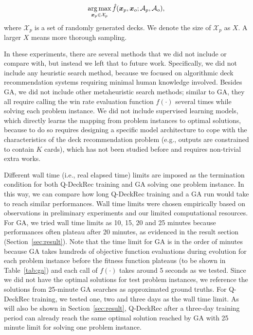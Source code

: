 \begin{align}
\operatorname*{arg\,max}_{\boldsymbol{x}_p \in \mathcal{X}_p} \hat{f}(\boldsymbol{x}_p, \boldsymbol{x}_o; \mathcal{A}_p, \mathcal{A}_o),
\label{eqn:mcmaxobj}
\end{align}
where $\mathcal{X}_p$ is a set of randomly generated decks. We denote the size of $\mathcal{X}_p$ as $X$. A larger $X$ means more thorough sampling.

In these experiments, there are several methods that we did not include or compare with, but instead we left that to future work. Specifically, we did not include any heuristic search method, because we focused on algorithmic deck recommendation systems requiring minimal human knowledge involved. Besides GA, we did not include other metaheuristic search methods; similar to GA, they all require calling the win rate evaluation function $f(\cdot)$ several times while solving each problem instance. We did not include supervised learning models, which directly learns the mapping from problem instances to optimal solutions, because to do so requires designing a specific model architecture to cope with the characteristics of the deck recommendation problem (e.g., outputs are constrained to contain $K$ cards), which has not been studied before and requires non-trivial extra works.

Different wall time (i.e., real elapsed time) limits are imposed as the termination condition for both Q-DeckRec training and GA solving one problem instance. In this way, we can compare how long Q-DeckRec training and a GA run would take to reach similar performances. Wall time limits were chosen empirically based on observations in preliminary experiments and our limited computational resources. For GA, we tried wall time limits as 10, 15, 20 and 25 minutes because performances often plateau after 20 minutes, as evidenced in the result section (Section~\ref{sec:result}). Note that the time limit for GA is in the order of minutes because GA takes hundreds of objective function evaluations during evolution for each problem instance before the fitness function plateaus (to be shown in Table~\ref{tab:ga}) and each call of $f(\cdot)$ takes around 5 seconds as we tested. Since we did not have the optimal solutions for test problem instances, we reference the solutions from 25-minute GA searches as approximated ground truths. For Q-DeckRec training, we tested one, two and three days as the wall time limit. As will also be shown in Section~\ref{sec:result}, Q-DeckRec after a three-day training period can already reach the same optimal solution reached by GA with 25 minute limit for solving one problem instance.

